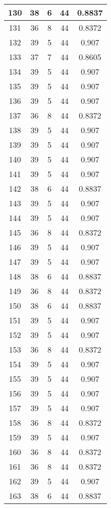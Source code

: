 \documentclass[letterpaper, 12pt]{article}
\begin{document}
\begin{longtable}{|c|c|c|c|c|}
\hline
130 & 38 & 6 & 44 & 0.8837 \\
\hline
131 & 36 & 8 & 44 & 0.8372 \\
\hline
132 & 39 & 5 & 44 & 0.907 \\
\hline
133 & 37 & 7 & 44 & 0.8605 \\
\hline
134 & 39 & 5 & 44 & 0.907 \\
\hline
135 & 39 & 5 & 44 & 0.907 \\
\hline
136 & 39 & 5 & 44 & 0.907 \\
\hline
137 & 36 & 8 & 44 & 0.8372 \\
\hline
138 & 39 & 5 & 44 & 0.907 \\
\hline
139 & 39 & 5 & 44 & 0.907 \\
\hline
140 & 39 & 5 & 44 & 0.907 \\
\hline
141 & 39 & 5 & 44 & 0.907 \\
\hline
142 & 38 & 6 & 44 & 0.8837 \\
\hline
143 & 39 & 5 & 44 & 0.907 \\
\hline
144 & 39 & 5 & 44 & 0.907 \\
\hline
145 & 36 & 8 & 44 & 0.8372 \\
\hline
146 & 39 & 5 & 44 & 0.907 \\
\hline
147 & 39 & 5 & 44 & 0.907 \\
\hline
148 & 38 & 6 & 44 & 0.8837 \\
\hline
149 & 36 & 8 & 44 & 0.8372 \\
\hline
150 & 38 & 6 & 44 & 0.8837 \\
\hline
151 & 39 & 5 & 44 & 0.907 \\
\hline
152 & 39 & 5 & 44 & 0.907 \\
\hline
153 & 36 & 8 & 44 & 0.8372 \\
\hline
154 & 39 & 5 & 44 & 0.907 \\
\hline
155 & 39 & 5 & 44 & 0.907 \\
\hline
156 & 39 & 5 & 44 & 0.907 \\
\hline
157 & 39 & 5 & 44 & 0.907 \\
\hline
158 & 36 & 8 & 44 & 0.8372 \\
\hline
159 & 39 & 5 & 44 & 0.907 \\
\hline
160 & 36 & 8 & 44 & 0.8372 \\
\hline
161 & 36 & 8 & 44 & 0.8372 \\
\hline
162 & 39 & 5 & 44 & 0.907 \\
\hline
163 & 38 & 6 & 44 & 0.8837 \\
\hline

\end{longtable}
\end{document}
